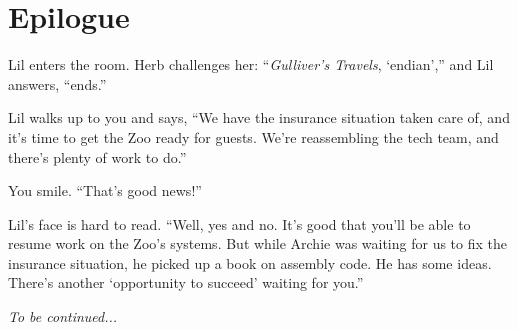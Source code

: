     \section{Epilogue}

    Lil enters the room.
    Herb challenges her: ``\textit{Gulliver's Travels}, `endian','' and Lil answers, ``ends.''

    Lil walks up to you and says, ``We have the insurance situation taken care of, and it's time to get the Zoo ready for guests.
    We're reassembling the tech team, and there's plenty of work to do.''

    You smile.
    ``That's good news!''

    Lil's face is hard to read.
    ``Well, yes and no.
    It's good that you'll be able to resume work on the Zoo's systems.
    But while Archie was waiting for us to fix the insurance situation, he picked up a book on assembly code.
    He has some ideas.
    There's another `opportunity to succeed' waiting for you.''

    \textit{To be continued...}


